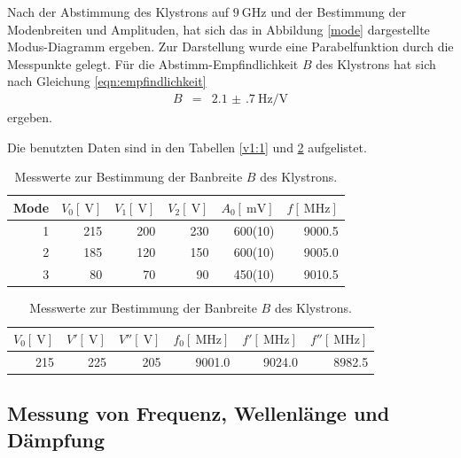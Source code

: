 Nach der Abstimmung des Klystrons auf $\SI{9}{\giga\hertz}$ und der Bestimmung der Modenbreiten und Amplituden, hat sich das in Abbildung \ref{mode} dargestellte Modus-Diagramm ergeben.
Zur Darstellung wurde eine Parabelfunktion durch die Messpunkte gelegt.
Für die Abstimm-Empfindlichkeit $B$ des Klystrons hat sich nach Gleichung \eqref{eqn:empfindlichkeit}
\begin{eqnarray}
	B &=& \SI{2.1(7)}{\hertz\per\volt}
\end{eqnarray}
ergeben.

Die benutzten Daten sind in den Tabellen \ref{v1:1} und \ref{v1:2} aufgelistet.

\begin{table}
\centering
\caption{Messwerte zur Darstellung des Modus-Diagramms.}
\begin{tabular}{r r r r r r}
	Mode & $V_\text{0}[\SI{}{\volt}]$ & $V_\text{1}[\SI{}{\volt}]$ & $V_\text{2}[\SI{}{\volt}]$ & $A_\text{0}[\SI{}{\milli\volt}]$ & $f[\SI{}{\mega\hertz}]$ \\
	\hline
	\hline
	1 & 215 & 200 & 230 & {600(10)} & 9000.5\\
	2 & 185 & 120 & 150 & {600(10)} & 9005.0\\
	3 &  80 &  70 &  90 & {450(10)} & 9010.5\\
	\hline
\end{tabular}
\label{v1:1}
\caption{Messwerte zur Bestimmung der Banbreite $B$ des Klystrons.}
\begin{tabular}{r r r r r r}
	$V_\text{0}[\SI{}{\volt}]$ & $V'[\SI{}{\volt}]$ & $V''[\SI{}{\volt}]$ & $f_\text{0}[\SI{}{\mega\hertz}]$  & $f'[\SI{}{\mega\hertz}]$ & $f''[\SI{}{\mega\hertz}]$ \\
	\hline
	\hline
	215 & 225 & 205 & 9001.0 & 9024.0 & 8982.5\\
	\hline
\end{tabular}
\label{v1:2}
\end{table}

\FloatBarrier

\subsection{Messung von Frequenz, Wellenlänge und Dämpfung} %
\label{sub:messung_von_frequenz_wellenlaenge_und_daempfung}

